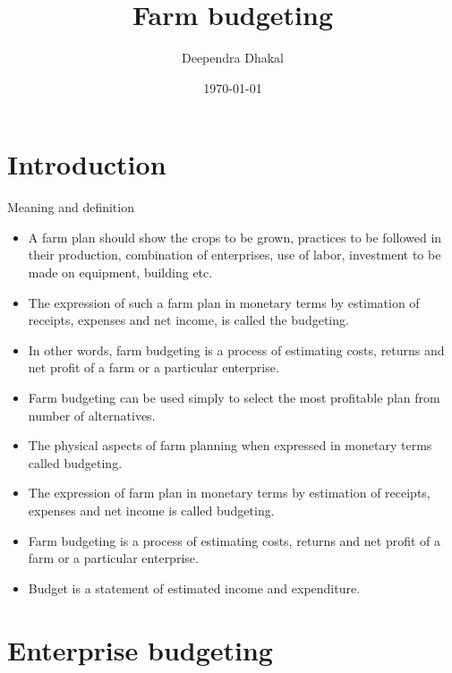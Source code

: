 \documentclass[12pt,ignorenonframetext,aspectratio=169]{beamer}
\title{\insertsectionhead}
  {
    \definecolor{white}{rgb}{0.776,0.357,0.157}
    \definecolor{iqss@orange}{rgb}{1,1,1}
    \ifnum \insertmainframenumber > \insertframenumber
    \frame{
      \frametitle{\iqsssectiontitleheader}
      \tableofcontents[currentsection]
    }
    \else
    \frame{
      \frametitle{Backup Slides}
      \tableofcontents[sectionstyle=shaded/shaded,subsectionstyle=shaded/shaded/shaded]
    }
    \fi
  }
\title[]{Farm budgeting}
\author[
        Deependra Dhakal
    ]{Deependra Dhakal}
\institute[
    ]{
    GAASC, Baitadi \and Tribhuwan University
    }
\date[
      \today
  ]{
      \today
        }
\providecommand{\tightlist}{%
  \setlength{\itemsep}{0pt}\setlength{\parskip}{0pt}}
\begin{document}
  \begin{frame}[plain]
  \titlepage
  \end{frame}



\hypertarget{introduction}{%
\section{Introduction}\label{introduction}}

\begin{frame}{Meaning and definition}
\protect\hypertarget{meaning-and-definition}{}
\begin{itemize}
\tightlist
\item
  A farm plan should show the crops to be grown, practices to be
  followed in their production, combination of enterprises, use of
  labor, investment to be made on equipment, building etc.
\item
  The expression of such a farm plan in monetary terms by estimation of
  receipts, expenses and net income, is called the budgeting.
\item
  In other words, farm budgeting is a process of estimating costs,
  returns and net profit of a farm or a particular enterprise.
\item
  Farm budgeting can be used simply to select the most profitable plan
  from number of alternatives.
\end{itemize}
\end{frame}

\begin{frame}{}
\protect\hypertarget{section}{}
\begin{itemize}
\tightlist
\item
  The physical aspects of farm planning when expressed in monetary terms
  called budgeting.
\item
  The expression of farm plan in monetary terms by estimation of
  receipts, expenses and net income is called budgeting.
\item
  Farm budgeting is a process of estimating costs, returns and net
  profit of a farm or a particular enterprise.
\item
  Budget is a statement of estimated income and expenditure.
\end{itemize}
\end{frame}

\hypertarget{enterprise-budgeting}{%
\section{Enterprise budgeting}\label{enterprise-budgeting}}
\end{document}
